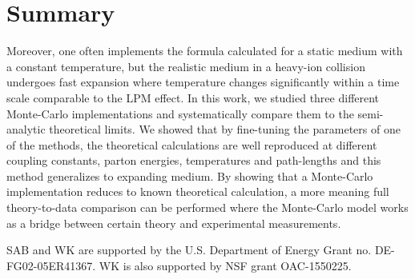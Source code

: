 \documentclass[aps, prc, reprint, amsmath, groupedaddress, nofootinbib]{revtex4-1}
\begin{document}
\section{Summary}
Moreover, one often implements the formula calculated for a static medium with a constant temperature, but the realistic medium in a heavy-ion collision undergoes fast expansion where temperature changes significantly within a time scale comparable to the LPM effect.
In this work, we studied three different Monte-Carlo implementations and systematically compare them to the semi-analytic theoretical limits.
We showed that by fine-tuning the parameters of one of the methods, the theoretical calculations are well reproduced at different coupling constants, parton energies, temperatures and path-lengths and this method generalizes to expanding medium. 
By showing that a Monte-Carlo implementation reduces to known theoretical calculation, a more meaning full theory-to-data comparison can be performed where the Monte-Carlo model works as a bridge between certain theory and experimental measurements.



\begin{acknowledgments}
SAB and WK  are supported by the U.S. Department of Energy Grant no. DE-FG02-05ER41367. WK is also supported by NSF grant OAC-1550225.
\end{acknowledgments}

\begin{appendices}
\end{appendices}
 
\end{document}
